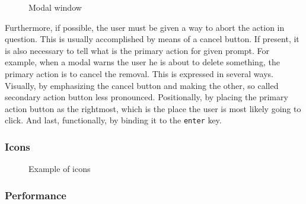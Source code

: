 \documentclass[thesis=M,english,hidelinks]{FITthesis}[2012/10/20]
\newcommand{\code}{\texttt}
\begin{document}
\begin{figure}
  \setlength\fboxsep{0pt}
  \setlength\fboxrule{0.2pt}
  \caption{Modal window}
  \label{fig:modal}
\end{figure}

Furthermore, if possible, the user must be given a way to abort the action in question. This is usually accomplished by means of a cancel button. If present, it is also necessary to tell what is the primary action for given prompt. For example, when a modal warns the user he is about to delete something, the primary action is to cancel the removal. This is expressed in several ways. Visually, by emphasizing the cancel button and making the other, so called secondary action button less pronounced. Positionally, by placing the primary action button as the rightmost, which is the place the user is most likely going to click. And last, functionally, by binding it to the \code{enter} key.

    \subsubsection{Icons}

\begin{figure}[H]
  \setlength\fboxsep{0pt}
  \setlength\fboxrule{0.2pt}
  \caption{Example of icons}
  \label{fig:icons}
\end{figure}

    \subsubsection{Performance}
\end{document}
